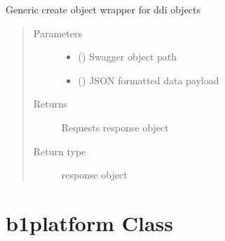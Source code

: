 \documentclass[letterpaper,10pt,english]{sphinxmanual}
\begin{document}
\begin{fulllineitems}
\begin{fulllineitems}
\end{fulllineitems}


\begin{fulllineitems}
\label{\detokenize{b1oph-class:bloxone.b1oph.update}}
\sphinxAtStartPar
Generic create object wrapper for ddi objects
\begin{quote}\begin{description}
\item[{Parameters}] \leavevmode\begin{itemize}
\item {} 
\sphinxAtStartPar
{} () \textendash{} Swagger object path

\item {} 
\sphinxAtStartPar
{} () \textendash{} JSON formatted data payload

\end{itemize}

\item[{Returns}] \leavevmode
\sphinxAtStartPar
Requests response object

\item[{Return type}] \leavevmode
\sphinxAtStartPar
response object

\end{description}\end{quote}

\end{fulllineitems}


\end{fulllineitems}



\section{b1platform Class}
\label{\detokenize{b1platform-class:b1platform-class}}\label{\detokenize{b1platform-class::doc}}
\end{document}
